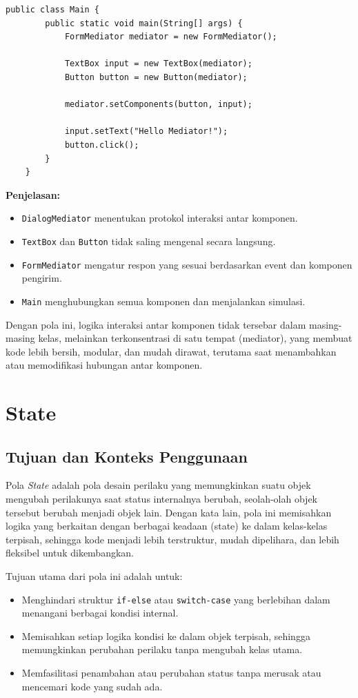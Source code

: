 \begin{lstlisting}[style=JavaStyle, caption={Client: Penggunaan Mediator}]
	public class Main {
		public static void main(String[] args) {
			FormMediator mediator = new FormMediator();
			
			TextBox input = new TextBox(mediator);
			Button button = new Button(mediator);
			
			mediator.setComponents(button, input);
			
			input.setText("Hello Mediator!");
			button.click();
		}
	}
\end{lstlisting}

\textbf{Penjelasan:}
\begin{itemize}
	\item \texttt{DialogMediator} menentukan protokol interaksi antar komponen.
	\item \texttt{TextBox} dan \texttt{Button} tidak saling mengenal secara langsung.
	\item \texttt{FormMediator} mengatur respon yang sesuai berdasarkan event dan komponen pengirim.
	\item \texttt{Main} menghubungkan semua komponen dan menjalankan simulasi.
\end{itemize}

Dengan pola ini, logika interaksi antar komponen tidak tersebar dalam masing-masing kelas, melainkan terkonsentrasi di satu tempat (mediator), yang membuat kode lebih bersih, modular, dan mudah dirawat, terutama saat menambahkan atau memodifikasi hubungan antar komponen.


\section{State}

\subsection{Tujuan dan Konteks Penggunaan}

Pola \textit{State} adalah pola desain perilaku yang memungkinkan suatu objek mengubah perilakunya saat status internalnya berubah, seolah-olah objek tersebut berubah menjadi objek lain. Dengan kata lain, pola ini memisahkan logika yang berkaitan dengan berbagai keadaan (state) ke dalam kelas-kelas terpisah, sehingga kode menjadi lebih terstruktur, mudah dipelihara, dan lebih fleksibel untuk dikembangkan.

Tujuan utama dari pola ini adalah untuk:
\begin{itemize}
	\item Menghindari struktur \texttt{if-else} atau \texttt{switch-case} yang berlebihan dalam menangani berbagai kondisi internal.
	\item Memisahkan setiap logika kondisi ke dalam objek terpisah, sehingga memungkinkan perubahan perilaku tanpa mengubah kelas utama.
	\item Memfasilitasi penambahan atau perubahan status tanpa merusak atau mencemari kode yang sudah ada.
\end{itemize}

